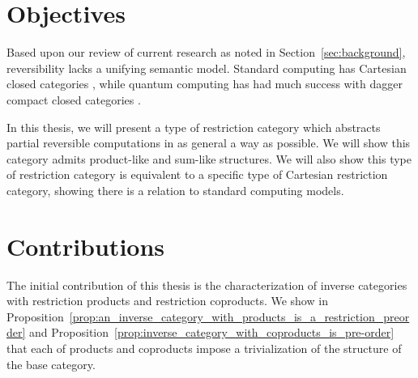 \section{Objectives}
\label{sec:objectives}

Based upon our review of current research as noted in Section~\ref{sec:background}, reversibility
lacks a unifying semantic model. Standard computing has Cartesian closed categories
\cite{barr:ctcs}, while quantum computing has had much success with dagger compact closed categories
\cite{selinger04:towardssemantics,selinger05:dagger,abramsky05:abstractscalars}.

In this thesis, we will present a type of restriction category which abstracts partial reversible
computations in as general a way as possible. We will show this category admits product-like and
sum-like structures. We will also show this type of restriction category is equivalent to a specific
type of Cartesian restriction category, showing there is a relation to standard computing models.

\section{Contributions}
\label{sec:contributions}

The initial contribution of this thesis is the characterization of inverse categories with
restriction products and restriction coproducts.  We show in
Proposition~\ref{prop:an_inverse_category_with_products_is_a_restriction_preorder} and
Proposition~\ref{prop:inverse_category_with_coproducts_is_pre-order} that each of products and
coproducts impose a trivialization of the structure of the base category.

